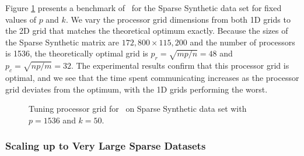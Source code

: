 Figure \ref{fig:procsweep} presents a benchmark of \BPP\ for the Sparse Synthetic data set for fixed values of $p$ and $k$.
We vary the processor grid dimensions from both 1D grids to the 2D grid that matches the theoretical optimum exactly.
Because the sizes of the Sparse Synthetic matrix are $172{,}800\times115{,}200$ and the number of processors is 1536, the theoretically optimal grid is $p_r = \sqrt{mp/n} = 48$ and $p_c = \sqrt{np/m} = 32$.
The experimental results confirm that this processor grid is optimal, and we see that the time spent communicating increases as the processor grid deviates from the optimum, with the 1D grids performing the worst.

\begin{figure}
\renewcommand{\datafile}{data/sparsesynpsweep_scale_pgf.dat}
\centering
{}
\caption{Tuning processor grid for \BPP\ on Sparse Synthetic data set with $p=1536$ and $k=50$.}
\label{fig:procsweep}
\end{figure}

\subsubsection{Scaling up to Very Large Sparse Datasets}\label{sec:webbase-2001}

